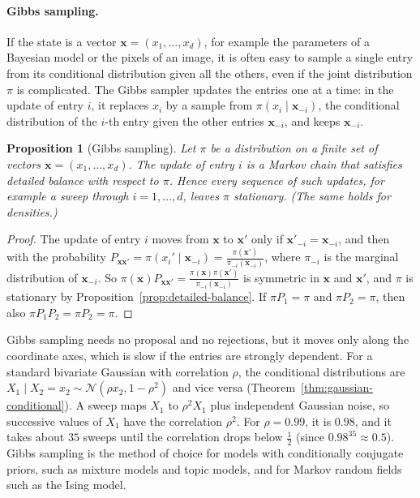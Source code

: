 \documentclass[11pt]{article}
\theoremstyle{definition}
\theoremstyle{plain}
\newtheorem{proposition}[definition]{Proposition}
\theoremstyle{remark}
\begin{document}
\paragraph{Gibbs sampling.} If the state is a vector $\mathbf{x} = (x_1, \ldots, x_d)$, for example the parameters of a Bayesian model or the pixels of an image, it is often easy to sample a single entry from its conditional distribution given all the others, even if the joint distribution $\pi$ is complicated. The Gibbs sampler updates the entries one at a time: in the update of entry $i$, it replaces $x_i$ by a sample from $\pi(x_i \mid \mathbf{x}_{-i})$, the conditional distribution of the $i$-th entry given the other entries $\mathbf{x}_{-i}$, and keeps $\mathbf{x}_{-i}$.

\begin{proposition}[Gibbs sampling]\label{prop:gibbs}
    Let $\pi$ be a distribution on a finite set of vectors $\mathbf{x} = (x_1, \ldots, x_d)$. The update of entry $i$ is a Markov chain that satisfies detailed balance with respect to $\pi$. Hence every sequence of such updates, for example a sweep through $i = 1, \ldots, d$, leaves $\pi$ stationary. (The same holds for densities.)
\end{proposition}

\begin{proof}
    The update of entry $i$ moves from $\mathbf{x}$ to $\mathbf{x}'$ only if $\mathbf{x}'_{-i} = \mathbf{x}_{-i}$, and then with the probability $P_{\mathbf{x}\mathbf{x}'} = \pi(x_i' \mid \mathbf{x}_{-i}) = \frac{\pi(\mathbf{x}')}{\pi_{-i}(\mathbf{x}_{-i})}$, where $\pi_{-i}$ is the marginal distribution of $\mathbf{x}_{-i}$. So $\pi(\mathbf{x})P_{\mathbf{x}\mathbf{x}'} = \frac{\pi(\mathbf{x})\pi(\mathbf{x}')}{\pi_{-i}(\mathbf{x}_{-i})}$ is symmetric in $\mathbf{x}$ and $\mathbf{x}'$, and $\pi$ is stationary by Proposition~\ref{prop:detailed-balance}. If $\pi P_1 = \pi$ and $\pi P_2 = \pi$, then also $\pi P_1P_2 = \pi P_2 = \pi$.
\end{proof}

Gibbs sampling needs no proposal and no rejections, but it moves only along the coordinate axes, which is slow if the entries are strongly dependent. For a standard bivariate Gaussian with correlation $\rho$, the conditional distributions are $X_1 \mid X_2 = x_2 \sim \mathcal{N}(\rho x_2, 1 - \rho^2)$ and vice versa (Theorem~\ref{thm:gaussian-conditional}). A sweep maps $X_1$ to $\rho^2X_1$ plus independent Gaussian noise, so successive values of $X_1$ have the correlation $\rho^2$. For $\rho = 0.99$, it is $0.98$, and it takes about $35$ sweeps until the correlation drops below $\frac{1}{2}$ (since $0.98^{35} \approx 0.5$). Gibbs sampling is the method of choice for models with conditionally conjugate priors, such as mixture models and topic models, and for Markov random fields such as the Ising model.
\end{document}
